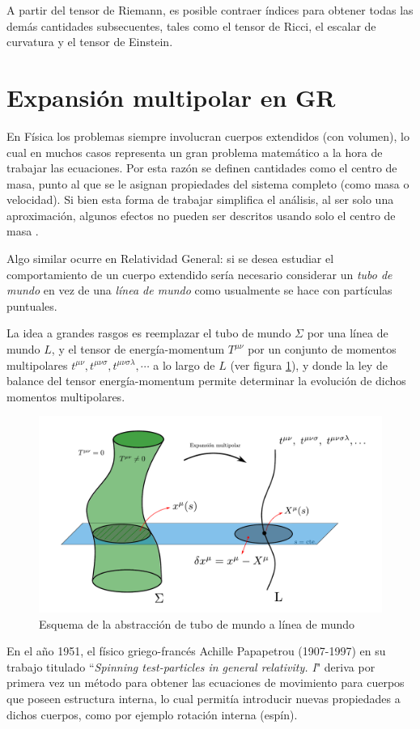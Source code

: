 A partir del tensor de Riemann, es posible contraer índices para obtener todas las demás cantidades subsecuentes, tales como el tensor de Ricci, el escalar de curvatura y el tensor de Einstein.

\section{Expansión multipolar en GR}

En Física los problemas siempre involucran cuerpos extendidos (con volumen), lo cual en muchos casos representa un gran problema matemático a la hora de trabajar las ecuaciones. Por esta razón se definen cantidades como el centro de masa, punto al que se le asignan propiedades del sistema completo (como masa o velocidad). Si bien esta forma de trabajar simplifica el análisis, al ser solo una aproximación, algunos efectos no pueden ser descritos usando solo el centro de masa \cite{nataly}.

Algo similar ocurre en Relatividad General: si se desea estudiar el comportamiento de un cuerpo extendido sería necesario considerar un \textit{tubo de mundo} en vez de una \textit{línea de mundo} como usualmente se hace con partículas puntuales.

La idea a grandes rasgos es reemplazar el tubo de mundo $\Sigma$ por una línea de mundo $L$, y el tensor de energía-momentum $T^{\mu \nu}$ por un conjunto de momentos multipolares $t^{\mu \nu}, t^{\mu \nu \sigma}, t^{\mu \nu \sigma \lambda}, \cdots$ a lo largo de $L$ (ver figura \ref{fig:1}), y donde la ley de balance del tensor energía-momentum permite determinar la evolución de dichos momentos multipolares.
\begin{figure}[!ht]
	\centering
	\includegraphics[scale=0.45]{images/papapetrou.pdf}
	\caption[Expansión multipolar en RG]{Esquema de la abstracción de tubo de mundo a línea de mundo}
	\label{fig:1}
\end{figure}
En el año 1951, el físico griego-francés Achille Papapetrou (1907-1997) en su trabajo titulado ``\textit{Spinning test-particles in general relativity. I}" \cite{Papapetrou2,Papapetrou1} deriva por primera vez un método para obtener las ecuaciones de movimiento para cuerpos que poseen estructura interna, lo cual permitía introducir nuevas propiedades a dichos cuerpos, como por ejemplo rotación interna (espín). 

